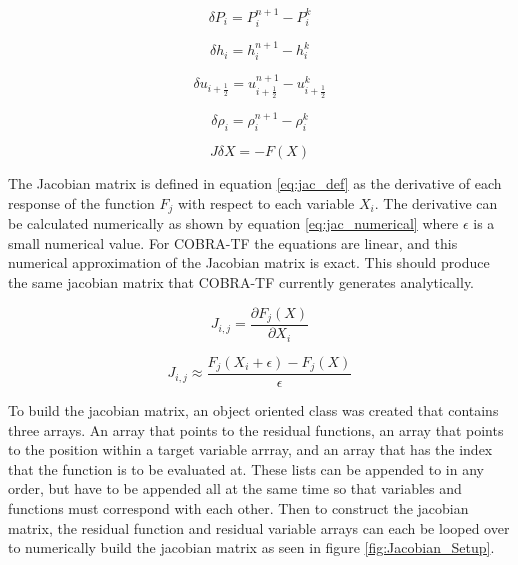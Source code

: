 \documentclass{mc2015}
\begin{document}
    \begin{equation}
    	\label{eq:residual_def:P}
    	\delta P_{i} = P^{n+1}_{i} - P^{k}_{i}
    \end{equation}
    
    \begin{equation}
    	\label{eq:residual_def:h}
    	\delta h_{i} = h^{n+1}_{i} - h^{k}_{i}
    \end{equation}
    
    \begin{equation}
    	\label{eq:residual_def:u}
    	\delta u_{i+\frac{1}{2}} = u^{n+1}_{i+\frac{1}{2}} - u^{k}_{i+\frac{1}{2}}
    \end{equation}
    
    \begin{equation}
    	\label{eq:residual_def:rho}
    	\delta \rho_{i} = \rho^{n+1}_{i} - \rho^{k}_{i}
    \end{equation}
    
    \begin{equation}
    	\label{eq:linear_system}
    	J \delta X = - F(X)
    \end{equation}
    
    The Jacobian matrix is defined in equation \eqref{eq:jac_def} as the derivative
    of each response of the function $F_{j}$ with respect to each variable $X_{i}$.
    The derivative can be calculated numerically as shown by equation
    \eqref{eq:jac_numerical} where $\epsilon$ is a small numerical value. For
    COBRA-TF the equations are linear, and this numerical approximation
    of the Jacobian matrix is exact. This should produce the same jacobian
    matrix that COBRA-TF currently generates analytically. 
    
    \begin{equation}
    	\label{eq:jac_def}
    	J_{i,j}=\frac{ \partial F_{j}(X)}{\partial X_{i}}
    \end{equation}
    
    \begin{equation}
    	\label{eq:jac_numerical}
    	J_{i,j}  \approx \frac{F_{j}(X_{i}+\epsilon)-F_{j}(X)}{\epsilon}
    \end{equation}
    
	To build the jacobian matrix, an object oriented class was created that
    contains three arrays. An array that points to the residual functions, an
    array that points to the position within a target variable arrray, and an
    array that has the index that the function is to be evaluated at. These
    lists can be appended to in any order, but have to be appended all at the
    same time so that variables and functions must correspond with each other.
    Then to construct the jacobian matrix, the residual function and residual
    variable arrays can each be looped over to numerically build the jacobian
    matrix as seen in figure \ref{fig:Jacobian_Setup}. 
    
\end{document}
